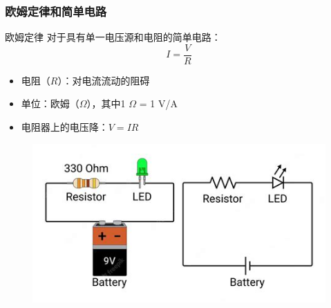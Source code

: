 \documentclass{beamer}
\begin{document}
\begin{frame}
    \frametitle{欧姆定律和简单电路}
    \begin{block}{欧姆定律}
        对于具有单一电压源和电阻的简单电路：
        \[ I = \frac{V}{R} \]
    \end{block}
    \begin{itemize}
        \item 电阻（$R$）：对电流流动的阻碍
        \item 单位：欧姆（$\Omega$），其中1 $\Omega$ = 1 V/A
        \item 电阻器上的电压降：$V = IR$
    \end{itemize}
    \begin{center}
        \begin{figure}
            \centering
            \includegraphics[width=0.5\linewidth]{th-991058791.jpg}
        \end{figure}
    \end{center}
\end{frame}
\end{document}
